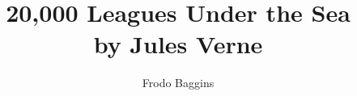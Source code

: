 \documentclass{gatech-thesis}
\title{20,000 Leagues Under the Sea \protect\\ by Jules Verne}
\author{Frodo Baggins}
\begin{document}

%
\begin{preliminary}
\begin{dedication}

\end{dedication}
\begin{acknowledgements}

\end{acknowledgements}
%
\contents
%
\begin{summary}

\end{summary}
\end{preliminary}
%



%
\appendix
%


%
\begin{postliminary}
\begin{vita}

\end{vita}
\end{postliminary}
\end{document}
